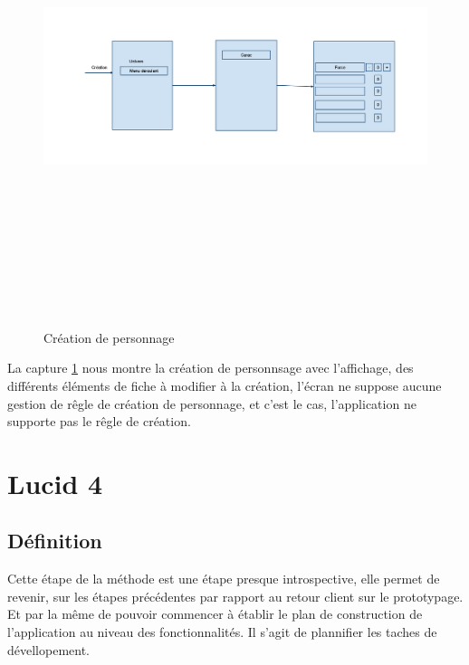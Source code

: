 \documentclass[11pt,a4paper]{article}
\begin{document}
\begin{figure}[h]
  	
  		\includegraphics[height=14cm,width=15cm]{image/screen5.png}
  		\caption{Création de personnage}
  		\label{screen5}
\end{figure}

La capture \ref{screen5} nous montre la création de personnsage avec l'affichage, des différents 
éléments de fiche à modifier à la création, l'écran ne suppose aucune gestion de rêgle de création 
de personnage, et c'est le cas, l'application ne supporte pas le rêgle de création.


\section{Lucid 4}

\subsection{Définition}

Cette étape de la méthode est une étape presque introspective, elle permet de
revenir, sur les étapes précédentes par rapport au retour client sur le
prototypage. Et par la même de pouvoir commencer à établir le plan de
construction de l'application au niveau des fonctionnalités. Il s'agit de
plannifier les taches de dévellopement. 
\end{document}
